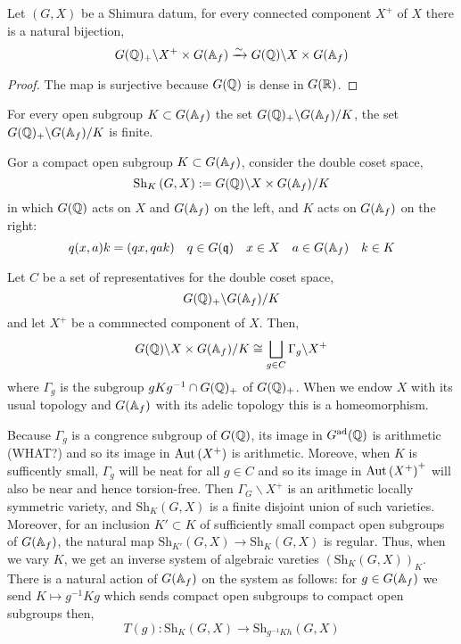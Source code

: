 \documentclass[12pt]{article}
\begin{document}
\renewcommand{\Sh}[2]{\mathrm{Sh}_{#1} \left( #2 \right)}

\begin{lemma}
Let $(G, X)$ be a Shimura datum, for every connected component $X^+$ of $X$ there is a natural bijection,
\[ G(\mathbb{Q})_+ \backslash X^+ \times G(\mathbb{A}_f) \xrightarrow{\sim} G(\mathbb{Q}) \backslash X \times G(\mathbb{A}_f) \]
\end{lemma}

\begin{proof}
The map is surjective because $G(\mathbb{Q})$ is dense in $G(\mathbb{R})$. 
\end{proof}

\begin{lemma}
For every open subgroup $K \subset G(\mathbb{A}_f)$ the set $G(\mathbb{Q})_+ \backslash G(\mathbb{A}_f) / K$, the set $G(\mathbb{Q})_+ \backslash G(\mathbb{A}_f) / K$ is finite.
\end{lemma}

\begin{defn}
Gor a compact open subgroup $K \subset G(\mathbb{A}_f)$, consider the double coset space,
\[ \Sh{K}{G, X} : = G(\Q) \backslash X \times G(\A_f) / K \]
in which $G(\mathbb{Q})$ acts on $X$ and $G(\mathbb{A}_f)$ on the left, and $K$ acts on $G(\mathbb{A}_f)$ on the right:
\[ q(x, a) k = (qx , q a k) \quad q \in G(\mathfrak{q}) \quad x \in X \quad a \in G(\mathbb{A}_f) \quad k \in K \]
\end{defn}

\begin{lemma}
Let $C$ be a set of representatives for the double coset space,
\[ G(\mathbb{Q})_+ \backslash G(\mathbb{A}_f) / K \]
and let $X^+$ be a commnected component of $X$. Then,
\[ G(\mathbb{Q}) \backslash X \times G(\mathbb{A}_f) / K \cong \bigsqcup_{g \in C} \Gamma_g \backslash X^+ \]
where $\Gamma_g$ is the subgroup $g K g^{-1} \cap G(\mathbb{Q})_+$ of $G(\mathbb{Q})_+$. When we endow $X$ with its usual topology and $G(\mathbb{A}_f)$ with its adelic topology this is a homeomorphism. 
\end{lemma}

\begin{rmk}
Because $\Gamma_g$ is a congrence subgroup of $G(\mathbb{Q})$, its image in $G^{\mathrm{ad}}(\mathbb{Q})$ is arithmetic (WHAT?) and so its image in $\mathrm{Aut} \left( X^+ \right)$ is arithmetic. Moreove, when $K$ is sufficently small, $\Gamma_g$ will be neat for all $g \in C$ and so its image in $\mathrm{Aut} \left( X^+ \right)^+$ will also be near and hence torsion-free. Then $\Gamma_G \backslash X^+$ is an arithmetic locally symmetric variety, and $\Sh{K}{G, X}$ is a finite disjoint union of such varieties. Moreover, for an inclusion $K' \subset K$ of sufficiently small compact open subgroups of $G(\mathbb{A}_f)$, the natural map $\Sh{K'}{G, X}
 \to \Sh{K}{G, X}$ is regular. Thus, when we vary $K$, we get an inverse system of algebraic vareties $(\Sh{K}{G, X})_K$. There is a natural action of $G(\mathbb{A}_f)$ on the system as follows: for $g \in G(\mathbb{A}_f)$ we send $K \mapsto g^{-1} K g$ which sends compact open subgroups to compact open subgroups then,
\[ T(g) : \Sh{K}{G, X} \to \Sh{g^{-1} K h}{G, X} \]
\end{rmk}
\end{document}
